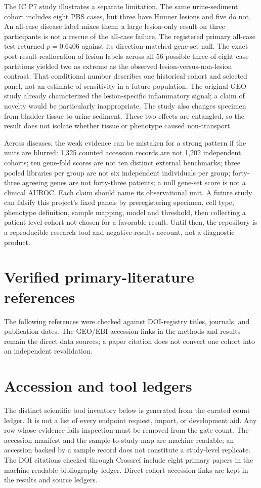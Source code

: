 \documentclass[11pt,a4paper]{article}
\begin{document}
The IC P7 study illustrates a separate limitation. The same urine-sediment cohort includes eight PBS cases, but three have Hunner lesions and five do not. An all-case disease label mixes them; a large lesion-only result on three participants is not a rescue of the all-case failure. The registered primary all-case test returned $p=0.6406$ against its direction-matched gene-set null. The exact post-result reallocation of lesion labels across all 56 possible three-of-eight case partitions yielded two as extreme as the observed lesion-versus-non-lesion contrast. That conditional number describes one historical cohort and selected panel, not an estimate of sensitivity in a future population. The original GEO study already characterized the lesion-specific inflammatory signal; a claim of novelty would be particularly inappropriate. The study also changes specimen from bladder tissue to urine sediment. These two effects are entangled, so the result does not isolate whether tissue or phenotype caused non-transport.

Across diseases, the weak evidence can be mistaken for a strong pattern if the units are blurred: 1,325 counted accession records are not 1,202 independent cohorts; ten gene-fold scores are not ten distinct external benchmarks; three pooled libraries per group are not six independent individuals per group; forty-three agreeing genes are not forty-three patients; a null gene-set score is not a clinical AUROC. Each claim should name its observational unit. A future study can falsify this project's fixed panels by preregistering specimen, cell type, phenotype definition, sample mapping, model and threshold, then collecting a patient-level cohort not chosen for a favorable result. Until then, the repository is a reproducible research tool and negative-results account, not a diagnostic product.

\section{Verified primary-literature references}
The following references were checked against DOI-registry titles, journals, and publication dates. The GEO/EBI accession links in the methods and results remain the direct data sources; a paper citation does not convert one cohort into an independent revalidation.


\appendix\section{Accession and tool ledgers}
The distinct scientific tool inventory below is generated from the curated count ledger. It is not a list of every endpoint request, import, or development aid. Any row whose evidence fails inspection must be removed from the gate count. The accession manifest and the sample-to-study map are machine readable; an accession backed by a sample record does not constitute a study-level replicate. The DOI citations checked through Crossref include eight primary papers in the machine-readable bibliography ledger. Direct cohort accession links are kept in the results and source ledgers.

 
\end{document}
